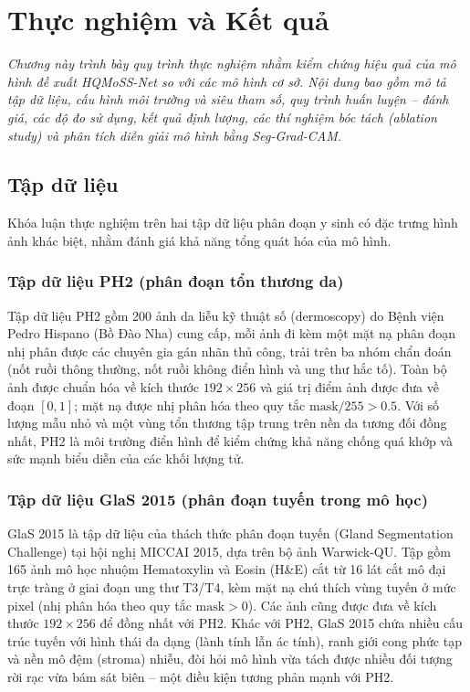 \chapter{Thực nghiệm và Kết quả}
\label{Chapter5}

\textit{Chương này trình bày quy trình thực nghiệm nhằm kiểm chứng hiệu quả của mô hình đề xuất HQMoSS-Net so với các mô hình cơ sở. Nội dung bao gồm mô tả tập dữ liệu, cấu hình môi trường và siêu tham số, quy trình huấn luyện -- đánh giá, các độ đo sử dụng, kết quả định lượng, các thí nghiệm bóc tách (ablation study) và phân tích diễn giải mô hình bằng Seg-Grad-CAM.}

\section{Tập dữ liệu}
Khóa luận thực nghiệm trên hai tập dữ liệu phân đoạn y sinh có đặc trưng hình ảnh khác biệt, nhằm đánh giá khả năng tổng quát hóa của mô hình.

\subsection{Tập dữ liệu PH2 (phân đoạn tổn thương da)}
Tập dữ liệu PH2 \cite{mendonca2013ph2} gồm 200 ảnh da liễu kỹ thuật số (dermoscopy) do Bệnh viện Pedro Hispano (Bồ Đào Nha) cung cấp, mỗi ảnh đi kèm một mặt nạ phân đoạn nhị phân được các chuyên gia gán nhãn thủ công, trải trên ba nhóm chẩn đoán (nốt ruồi thông thường, nốt ruồi không điển hình và ung thư hắc tố). Toàn bộ ảnh được chuẩn hóa về kích thước $192 \times 256$ và giá trị điểm ảnh được đưa về đoạn $[0,1]$; mặt nạ được nhị phân hóa theo quy tắc $\text{mask}/255 > 0.5$. Với số lượng mẫu nhỏ và một vùng tổn thương tập trung trên nền da tương đối đồng nhất, PH2 là môi trường điển hình để kiểm chứng khả năng chống quá khớp và sức mạnh biểu diễn của các khối lượng tử.

\subsection{Tập dữ liệu GlaS 2015 (phân đoạn tuyến trong mô học)}
GlaS 2015 \cite{sirinukunwattana2017glas} là tập dữ liệu của thách thức phân đoạn tuyến (Gland Segmentation Challenge) tại hội nghị MICCAI 2015, dựa trên bộ ảnh Warwick-QU. Tập gồm 165 ảnh mô học nhuộm Hematoxylin và Eosin (H\&E) cắt từ 16 lát cắt mô đại trực tràng ở giai đoạn ung thư T3/T4, kèm mặt nạ chú thích vùng tuyến ở mức pixel (nhị phân hóa theo quy tắc $\text{mask} > 0$). Các ảnh cũng được đưa về kích thước $192 \times 256$ để đồng nhất với PH2. Khác với PH2, GlaS 2015 chứa nhiều cấu trúc tuyến với hình thái đa dạng (lành tính lẫn ác tính), ranh giới cong phức tạp và nền mô đệm (stroma) nhiễu, đòi hỏi mô hình vừa tách được nhiều đối tượng rời rạc vừa bám sát biên -- một điều kiện tương phản mạnh với PH2.

